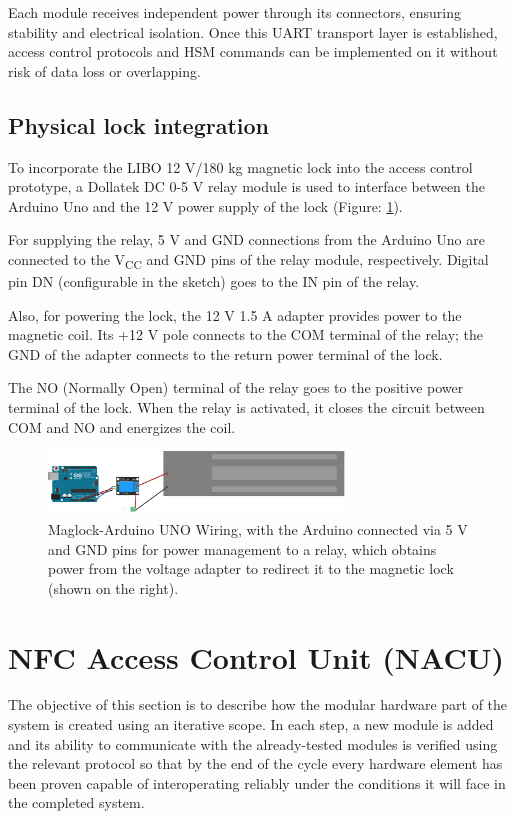Each module receives independent power through its connectors, ensuring stability and electrical isolation. Once this UART transport layer is established, access control protocols and HSM commands can be implemented on it without risk of data loss or overlapping.

\subsection{Physical lock integration}


To incorporate the LIBO 12 V/180 kg magnetic lock into the access control prototype, a Dollatek DC 0-5 V relay module is used to interface between the Arduino Uno and the 12 V power supply of the lock (Figure: \ref{fig:maglock_arduino}).

For supplying the relay, 5 V and GND connections from the Arduino Uno are connected to the V\textsubscript{CC} and GND pins of the relay module, respectively. Digital pin DN (configurable in the sketch) goes to the IN pin of the relay.

Also, for powering the lock, the 12 V 1.5 A adapter provides power to the magnetic coil. Its +12 V pole connects to the COM terminal of the relay; the GND of the adapter connects to the return power terminal of the lock.

The NO (Normally Open) terminal of the relay goes to the positive power terminal of the lock. When the relay is activated, it closes the circuit between COM and NO and energizes the coil.

\begin{figure}[H]
	\centering
	\includegraphics[width=0.7\textwidth]{imaxes/maglock.png}
	\caption{Maglock-Arduino UNO Wiring, with the Arduino connected via 5 V and GND pins for power management to a relay, which obtains power from the voltage adapter to redirect it to the magnetic lock (shown on the right).}
	\label{fig:maglock_arduino}
\end{figure}

\section{NFC Access Control Unit (NACU)}
\label{sec:NACU2}

The objective of this section is to describe how the modular hardware part of the system is created using an iterative scope. In each step, a new module is added and its ability to communicate with the already‑tested modules is verified using the relevant protocol so that by the end of the cycle every hardware element has been proven capable of interoperating reliably under the conditions it will face in the completed system.

